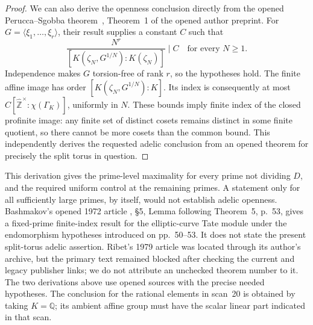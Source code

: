 \begin{proof}
We can also derive the openness conclusion directly from the opened
Perucca--Sgobba theorem~\cite{PeruccaSgobba2019}, Theorem~1 of the
opened author preprint.
For $G=\langle\xi_1,\ldots,\xi_r\rangle$, their result supplies a
constant $C$ such that
\[
 \frac{N^r}{[K(\zeta_N,G^{1/N}):K(\zeta_N)]}\mid C
 \quad\text{for every }N\geq1.
\]
Independence makes $G$ torsion-free of rank $r$, so the hypotheses hold.
The finite affine image has order $[K(\zeta_N,G^{1/N}):K]$.
Its index is consequently at most
$C[\widehat{\mathbb Z}^{\times}:\chi(\Gamma_K)]$, uniformly in $N$.
These bounds imply finite index of the closed profinite image:
any finite set of distinct cosets remains distinct in some finite
quotient, so there cannot be more cosets than the common bound.
This independently derives the requested adelic conclusion from an
opened theorem for precisely the split torus in question.
\end{proof}

This derivation gives the prime-level maximality for every prime not
dividing $D$, and the required uniform control at the remaining primes.
A statement only for all sufficiently large primes, by itself, would
not establish adelic openness. Bashmakov's opened 1972 article
\cite{Bashmakov1972}, \S5, Lemma following Theorem~5, p.~53, gives
a fixed-prime finite-index result for the elliptic-curve Tate module
under the endomorphism hypotheses introduced on pp.~50--53. It does
not state the present split-torus adelic assertion. Ribet's 1979
article was located through its author's archive, but the primary
text remained blocked after checking the current and legacy publisher
links; we do not attribute an unchecked theorem number to it.
The two derivations above use opened sources with the precise needed
hypotheses. The conclusion for the rational elements in scan~20
is obtained by taking $K=\mathbb Q$; its ambient affine group must
have the scalar linear part indicated in that scan.
